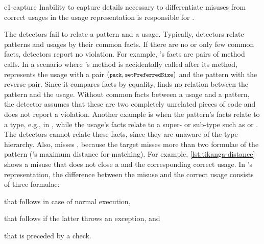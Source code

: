 \begin{obs}{e1-capture}
 Inability to capture details necessary to differentiate misuses from correct usages in the usage representation is responsible for .
\end{obs}

\vspace{0.03in}
The detectors fail to relate a pattern and a usage.
Typically, detectors relate patterns and usages by their common facts.
If there are no or only few common facts, detectors report no violation.
For example, \Jadet's facts are pairs of method calls.
In a scenario where 's  method is accidentally called after its  method, \Jadet represents the usage with a pair $({\texttt{\footnotesize{pack}}}, {\texttt{\footnotesize{setPreferredSize}}})$ and the pattern with the reverse pair.
Since it compares facts by equality, \Jadet finds no relation between the pattern and the usage.
Without common facts between a usage and a pattern, the detector assumes that these are two completely unrelated pieces of code and does not report a violation.
%
Another example is when the pattern's facts relate to a type, e.g.,  in , while the usage's facts relate to a super- or sub-type such as  or .
The detectors cannot relate these facts, since they are unaware of the type hierarchy.
%
Also, \Tikanga misses , because the target misses more than two formulae of the pattern (\Tikanga's maximum distance for matching).
For example, \autoref{lst:tikanga-distance} shows a misuse that does not close a  and the corresponding correct usage.
In \Tikanga's representation, the difference between the misuse and the correct usage consists of three formulae:
\begin{enumerate*}[label=(\arabic*)]
  \item that  follows  in case of normal execution,
  \item that  follows  if the latter throws an exception, and
  \item that  is preceded by a  check.
\end{enumerate*}

